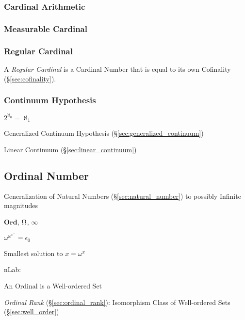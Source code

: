 \subsubsection{Cardinal Arithmetic}\label{sec:cardinal_arithmetic}

\subsubsection{Measurable Cardinal}\label{sec:measurable_cardinal}

\subsubsection{Regular Cardinal}\label{sec:regular_cardinal}

A \emph{Regular Cardinal} is a Cardinal Number that is equal to its
own Cofinality (\S\ref{sec:cofinality}).



\subsubsection{Continuum Hypothesis}\label{sec:continuum_hypothesis}

$2^{\aleph_0} = \aleph_1$

Generalized Continuum Hypothesis (\S\ref{sec:generalized_continuum})

Linear Continuum (\S\ref{sec:linear_continuum})



\subsection{Ordinal Number}\label{sec:ordinal_number}

Generalization of Natural Numbers (\S\ref{sec:natural_number}) to
possibly Infinite magnitudes %

$\mathbf{Ord}$, $\Omega$, $\infty$

$\omega^{\omega^{\omega^{\cdots}}} = \epsilon_0$

Smallest solution to $x = \omega^x$

nLab:

An Ordinal is a Well-ordered Set

\emph{Ordinal Rank} (\S\ref{sec:ordinal_rank}): Isomorphism Class of
Well-ordered Sets (\S\ref{sec:well_order})

